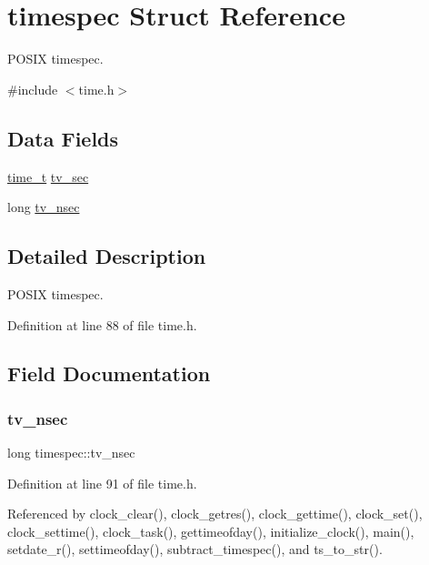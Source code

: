 \hypertarget{structtimespec}{}\section{timespec Struct Reference}
\label{structtimespec}


P\+O\+S\+IX timespec.  




{\ttfamily \#include $<$time.\+h$>$}

\subsection*{Data Fields}
\begin{DoxyCompactItemize}
\item 
\hyperlink{time_8h_a3346b04b0420b32ccf6b706551b70762}{time\+\_\+t} \hyperlink{structtimespec_afc3302668d7cb5952f590da69fdd4955}{tv\+\_\+sec}
\item 
long \hyperlink{structtimespec_ae3c7510dafa8cbcaede866ed13c99683}{tv\+\_\+nsec}
\end{DoxyCompactItemize}


\subsection{Detailed Description}
P\+O\+S\+IX timespec. 

Definition at line 88 of file time.\+h.



\subsection{Field Documentation}
\mbox{\label{structtimespec_ae3c7510dafa8cbcaede866ed13c99683}} 
\subsubsection{\texorpdfstring{tv\+\_\+nsec}{tv\_nsec}}
{\footnotesize\ttfamily long timespec\+::tv\+\_\+nsec}



Definition at line 91 of file time.\+h.



Referenced by clock\+\_\+clear(), clock\+\_\+getres(), clock\+\_\+gettime(), clock\+\_\+set(), clock\+\_\+settime(), clock\+\_\+task(), gettimeofday(), initialize\+\_\+clock(), main(), setdate\+\_\+r(), settimeofday(), subtract\+\_\+timespec(), and ts\+\_\+to\+\_\+str().


